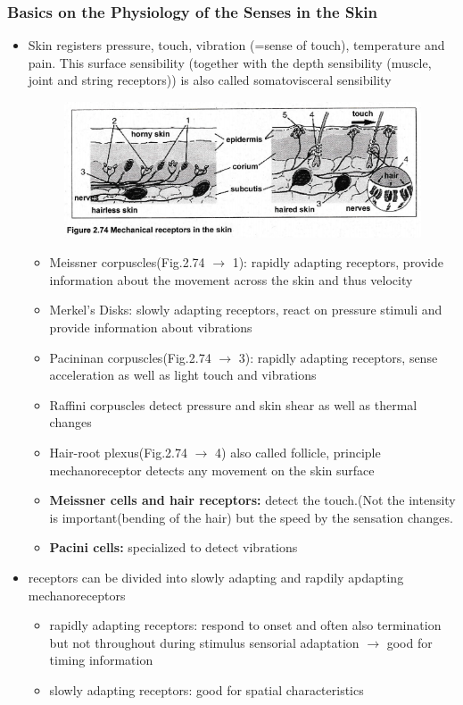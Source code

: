 \documentclass{standalone}
\begin{document}
\subsubsection*{Basics on the Physiology of the Senses in the Skin}
\begin{itemize}
	\item Skin registers pressure, touch, vibration (=sense of touch), temperature and pain. This surface sensibility (together with the depth sensibility (muscle, joint and string receptors)) is also called somatovisceral sensibility
	\begin{figure}[H]
			\centering
			\includegraphics[width = 0.7\linewidth]{Figures/2_74.png}
	\end{figure}
	\begin{itemize}
		\item Meissner corpuscles(Fig.2.74 $\rightarrow$ 1): rapidly adapting receptors, provide information about the movement across the skin and thus velocity
		\item Merkel's Disks: slowly adapting receptors, react on pressure stimuli and provide information about vibrations
		\item Pacininan corpuscles(Fig.2.74 $\rightarrow$ 3): rapidly adapting receptors, sense acceleration as well as light touch and vibrations
		\item Raffini corpuscles detect pressure and skin shear as well as thermal changes
		\item Hair-root plexus(Fig.2.74 $\rightarrow$ 4) also called follicle, principle mechanoreceptor detects any movement on the skin surface
		\item \textbf{Meissner cells and hair receptors:} detect the touch.(Not the intensity is important(bending of the hair) but the speed by the sensation changes.
		\item \textbf{Pacini cells:} specialized to detect vibrations
	\end{itemize}
	\item receptors can be divided into slowly adapting and rapdily apdapting mechanoreceptors
	\begin{itemize}
		\item rapidly adapting receptors: respond to onset and often also termination but not throughout during stimulus sensorial adaptation $\rightarrow$ good for timing information
		\item slowly adapting receptors: good for spatial characteristics
	

\end{itemize}
\end{itemize}
\end{document}
